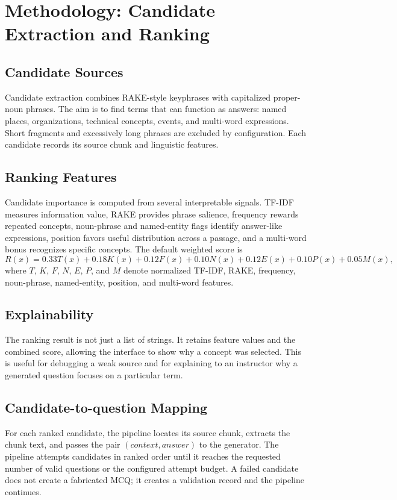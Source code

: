 \documentclass[12pt,a4paper]{report}
\begin{document}
\clearpage
\chapter{Methodology: Candidate Extraction and Ranking}
\section{Candidate Sources}
Candidate extraction combines RAKE-style keyphrases with capitalized proper-noun phrases. The aim is to find terms that can function as answers: named places, organizations, technical concepts, events, and multi-word expressions. Short fragments and excessively long phrases are excluded by configuration. Each candidate records its source chunk and linguistic features.

\section{Ranking Features}
Candidate importance is computed from several interpretable signals. TF-IDF measures information value, RAKE provides phrase salience, frequency rewards repeated concepts, noun-phrase and named-entity flags identify answer-like expressions, position favors useful distribution across a passage, and a multi-word bonus recognizes specific concepts. The default weighted score is
\begin{equation}
R(x)=0.33T(x)+0.18K(x)+0.12F(x)+0.10N(x)+0.12E(x)+0.10P(x)+0.05M(x),
\end{equation}
where $T$, $K$, $F$, $N$, $E$, $P$, and $M$ denote normalized TF-IDF, RAKE, frequency, noun-phrase, named-entity, position, and multi-word features.

\section{Explainability}
The ranking result is not just a list of strings. It retains feature values and the combined score, allowing the interface to show why a concept was selected. This is useful for debugging a weak source and for explaining to an instructor why a generated question focuses on a particular term.

\section{Candidate-to-question Mapping}
For each ranked candidate, the pipeline locates its source chunk, extracts the chunk text, and passes the pair $(context, answer)$ to the generator. The pipeline attempts candidates in ranked order until it reaches the requested number of valid questions or the configured attempt budget. A failed candidate does not create a fabricated MCQ; it creates a validation record and the pipeline continues.
\end{document}
